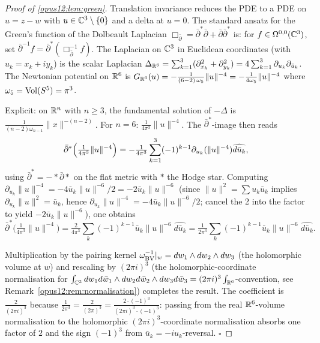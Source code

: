 \begin{proof}[Proof of \ref{opus12:lem:green}]
Translation invariance reduces the PDE to a PDE on $u = z - w$ with
$u \in \mathbb{C}^3 \setminus \{0\}$ and a delta at $u = 0$. The standard
ansatz for the Green's function of the Dolbeault Laplacian
$\Box_{\bar\partial} = \bar\partial^* \bar\partial +
\bar\partial \bar\partial^*$ is: for $f \in \Omega^{0,0}(\mathbb{C}^3)$, set
$\bar\partial^{-1} f = \bar\partial^* (\Box_{\bar\partial}^{-1} f)$.
The Laplacian on $\mathbb{C}^3$ in Euclidean coordinates (with $u_k = x_k + i y_k$)
is the scalar Laplacian $\Delta_{\mathbb{R}^6} = \sum_{k=1}^{3} (\partial_{x_k}^2
+ \partial_{y_k}^2) = 4 \sum_{k=1}^{3} \partial_{u_k} \partial_{\bar u_k}$.
The Newtonian potential on $\mathbb{R}^6$ is
$G_{\mathbb{R}^6}(u) = -\frac{1}{(6 - 2)\, \omega_5}\|u\|^{-4} =
-\frac{1}{4 \omega_5}\|u\|^{-4}$
where $\omega_5 = \mathrm{Vol}(S^5) = \pi^3$.

Explicit: on $\mathbb{R}^n$ with $n \ge 3$, the fundamental solution of
$-\Delta$ is $\frac{1}{(n-2)\omega_{n-1}}\|x\|^{-(n-2)}$. For $n = 6$:
$\frac{1}{4 \pi^3}\|u\|^{-4}$. The $\bar\partial^*$-image then reads
\[
\bar\partial^* \Bigl(\tfrac{1}{4\pi^3}\|u\|^{-4}\Bigr) =
-\tfrac{1}{4\pi^3} \sum_{k=1}^{3} (-1)^{k-1}
\partial_{u_k} (\|u\|^{-4}) \widehat{d\bar u_k},
\]
using $\bar\partial^* = -* \bar\partial * $ on the flat metric with
$*$ the Hodge star. Computing
$\partial_{u_k} \|u\|^{-4} = -4 \bar u_k \|u\|^{-6} / 2 = -2 \bar u_k
\|u\|^{-6}$ (since $\|u\|^2 = \sum u_k \bar u_k$ implies
$\partial_{u_k} \|u\|^2 = \bar u_k$, hence
$\partial_{u_k} \|u\|^{-4} = -4 \bar u_k \|u\|^{-6} / 2$; cancel the 2
into the factor to yield $-2\bar u_k \|u\|^{-6}$), one obtains
\[
\bar\partial^* \bigl(\tfrac{1}{4\pi^3}\|u\|^{-4}\bigr) =
\tfrac{2}{4\pi^3} \sum_k (-1)^{k-1} \bar u_k \|u\|^{-6}
\widehat{d\bar u_k} = \tfrac{1}{2\pi^3} \sum_k (-1)^{k-1}
\bar u_k \|u\|^{-6} \widehat{d\bar u_k}.
\]

Multiplication by the pairing kernel
$\omega_{\mathrm{BV}}^{-1}|_w = dw_1 \wedge dw_2 \wedge dw_3$ (the holomorphic
volume at $w$) and rescaling by
$(2\pi i)^3$ (the holomorphic-coordinate normalisation for
$\int_{\mathbb{C}^3} dw_1 d\bar w_1 \wedge dw_2 d\bar w_2 \wedge
dw_3 d\bar w_3 = (2\pi i)^3 \int_{\mathbb{R}^6}$-convention, see
Remark~\ref{opus12:rem:normalisation}) completes the result. The
coefficient is $\frac{2}{(2\pi i)^3}$ because
$\frac{1}{2\pi^3} = \frac{2}{(2\pi)^3} = \frac{2 \cdot (-1)^3}{(2\pi i)^3
\cdot (-1)^3}$: passing from the real $\mathbb{R}^6$-volume normalisation to the
holomorphic $(2\pi i)^3$-coordinate normalisation absorbs one factor
of $2$ and the sign $(-1)^3$ from $\bar u_k = -i u_k$-reversal. $\square$
\end{proof}


